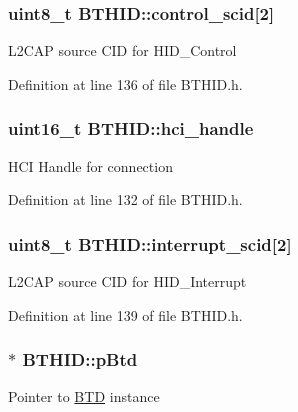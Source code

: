 \hypertarget{class_b_t_h_i_d_acf6933a4988ed9f48c6e08cc7c9b906c}{
\subsubsection[{control\-\_\-scid}]{\setlength{\rightskip}{0pt plus 5cm}uint8\-\_\-t {\bf \-B\-T\-H\-I\-D\-::control\-\_\-scid}\mbox{[}2\mbox{]}}}\label{class_b_t_h_i_d_acf6933a4988ed9f48c6e08cc7c9b906c}
\-L2\-C\-A\-P source \-C\-I\-D for \-H\-I\-D\-\_\-\-Control 

\-Definition at line 136 of file \-B\-T\-H\-I\-D.\-h.

\hypertarget{class_b_t_h_i_d_a8e4888359cda09bc7123d971bb9d8dcf}{
\subsubsection[{hci\-\_\-handle}]{\setlength{\rightskip}{0pt plus 5cm}uint16\-\_\-t {\bf \-B\-T\-H\-I\-D\-::hci\-\_\-handle}}}\label{class_b_t_h_i_d_a8e4888359cda09bc7123d971bb9d8dcf}
\-H\-C\-I \-Handle for connection 

\-Definition at line 132 of file \-B\-T\-H\-I\-D.\-h.

\hypertarget{class_b_t_h_i_d_a34a91f92ea32033403c2b37af92535dc}{
\subsubsection[{interrupt\-\_\-scid}]{\setlength{\rightskip}{0pt plus 5cm}uint8\-\_\-t {\bf \-B\-T\-H\-I\-D\-::interrupt\-\_\-scid}\mbox{[}2\mbox{]}}}\label{class_b_t_h_i_d_a34a91f92ea32033403c2b37af92535dc}
\-L2\-C\-A\-P source \-C\-I\-D for \-H\-I\-D\-\_\-\-Interrupt 

\-Definition at line 139 of file \-B\-T\-H\-I\-D.\-h.

\hypertarget{class_b_t_h_i_d_a02c37811a4a401618caf188e744e8e3d}{
\subsubsection[{p\-Btd}]{$\ast$ {\bf \-B\-T\-H\-I\-D\-::p\-Btd}}}\label{class_b_t_h_i_d_a02c37811a4a401618caf188e744e8e3d}
\-Pointer to \hyperlink{class_b_t_d}{\-B\-T\-D} instance 

